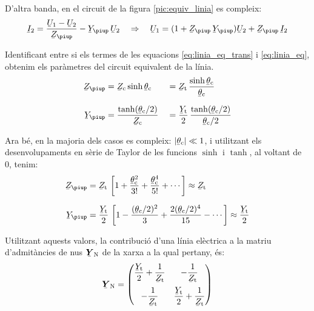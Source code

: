 D'altra banda, en el circuit de la figura \vref{pic:equiv_linia} es compleix:
\begin{equation}\label{eq:linia_eq}
   \cmplx{I}_2 = \frac{\cmplx{U}_1 - \cmplx{U}_2}{\cmplx{Z}_\piup} - \cmplx{Y}_\piup\, \cmplx{U}_2
   \quad \Rightarrow\quad
   \cmplx{U}_1 = (1 + \cmplx{Z}_\piup\,\cmplx{Y}_\piup ) \cmplx{U}_2 + \cmplx{Z}_\piup\,\cmplx{I}_2
\end{equation}

Identificant entre si els termes de les equacions
\eqref{eq:linia_eq_trans} i \eqref{eq:linia_eq}, obtenim els
paràmetres del circuit equivalent de la línia.
\begin{alignat}{2}
   \cmplx{Z}_\piup &= \cmplx{Z}\ped{c} \sinh \cmplx{\theta}\ped{c} &&= \cmplx{Z}\ped{t} \,
   \frac{\sinh \cmplx{\theta}\ped{c}}{\cmplx{\theta}\ped{c}} \\[1.5ex]
   \cmplx{Y}_\piup &= \frac{\tanh (\cmplx{\theta}\ped{c} / 2) }{\cmplx{Z}\ped{c}} &&=
   \frac{\cmplx{Y}\ped{t}}{2} \, \frac{\tanh (\cmplx{\theta}\ped{c} / 2)}{\cmplx{\theta}\ped{c} / 2}
\end{alignat}

Ara bé, en la majoria dels casos es compleix: $|\cmplx{\theta}\ped{c}| \ll 1$, i utilitzant els desenvolupaments en sèrie de Taylor de les funcions $\sinh$ i $\tanh$, al voltant de 0, tenim:
\begin{align}
   \cmplx{Z}_\piup &= \cmplx{Z}\ped{t} \, \left[ 1 + \frac{\cmplx{\theta}\ped{c}^2}{3!} +
   \frac{\cmplx{\theta}\ped{c}^4}{5!} + \cdots \right] \approx \cmplx{Z}\ped{t} \\[1.5ex]
   \cmplx{Y}_\piup &= \frac{\cmplx{Y}\ped{t}}{2} \,\left[ 1 - \frac{(\cmplx{\theta}\ped{c}/2)^2}{3} + \frac{2 (\cmplx{\theta}\ped{c}/2)^4}{15} - \cdots \right] \approx \frac{\cmplx{Y}\ped{t}}{2}
\end{align}

Utilitzant aquests valors, la contribució d'una línia elèctrica a
la matriu d'admitàncies de nus $\mcmplx{Y}\ped{N}$ de la xarxa a la
qual pertany, és: 
\begin{equation}
   \mcmplx{Y}\ped{N} = \begin{pmatrix}
     \dfrac{\cmplx{Y}\ped{t}}{2} + \dfrac{1}{\cmplx{Z}\ped{t}} & -\dfrac{1}{\cmplx{Z}\ped{t}}\\[2.5ex]
     -\dfrac{1}{\cmplx{Z}\ped{t}} & \dfrac{\cmplx{Y}\ped{t}}{2} + \dfrac{1}{\cmplx{Z}\ped{t}}
   \end{pmatrix}
\end{equation}

